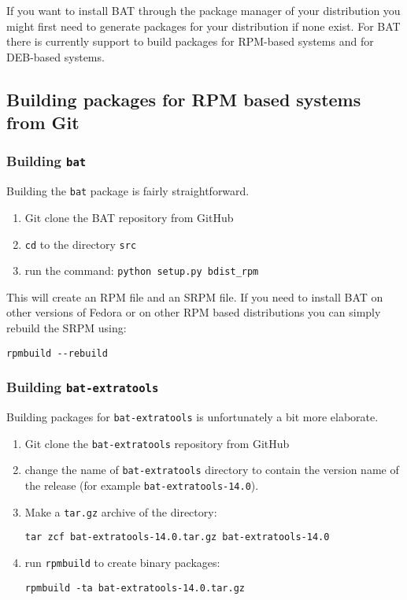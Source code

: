 \documentclass[10pt,a4paper]{article}
\begin{document}
If you want to install BAT through the package manager of your distribution you
might first need to generate packages for your distribution if none exist. For
BAT there is currently support to build packages for RPM-based systems and for
DEB-based systems.

\subsection{Building packages for RPM based systems from Git}

\subsubsection{Building \texttt{bat}}

Building the \texttt{bat} package is fairly straightforward.

\begin{enumerate}
\item Git clone the BAT repository from GitHub
\item \texttt{cd} to the directory \texttt{src}
\item run the command: \texttt{python setup.py bdist\_rpm}
\end{enumerate}

This will create an RPM file and an SRPM file. If you need to install BAT on
other versions of Fedora or on other RPM based distributions you can simply
rebuild the SRPM using:

\begin{verbatim}
rpmbuild --rebuild
\end{verbatim}

\subsubsection{Building \texttt{bat-extratools}}

Building packages for \texttt{bat-extratools} is unfortunately a bit more elaborate.

\begin{enumerate}
\item Git clone the \texttt{bat-extratools} repository from GitHub
\item change the name of \texttt{bat-extratools} directory to contain the version name of the
release (for example \texttt{bat-extratools-14.0}).
\item Make a \texttt{tar.gz} archive of the directory:

\begin{verbatim}
tar zcf bat-extratools-14.0.tar.gz bat-extratools-14.0
\end{verbatim}

\item run \texttt{rpmbuild} to create binary packages:

\begin{verbatim}
rpmbuild -ta bat-extratools-14.0.tar.gz
\end{verbatim}
\end{enumerate}
\end{document}
